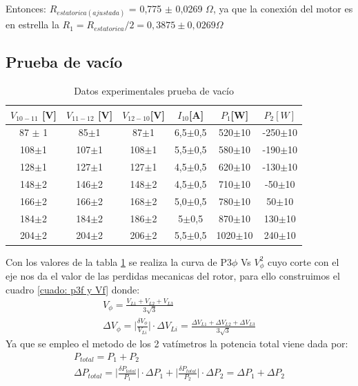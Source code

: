 \documentclass[11pt,letterpaper]{article}     %
\begin{document}
Entonces: $R_{estatorica(ajustada)}$ = 0,775 $\pm$ 0,0269 $\Omega$, ya que la conexión del motor es en estrella la $R_1=R_{estatorica}/2 = 0,3875 \pm 0,0269 \Omega$ 
\subsection{Prueba de vacío}
\begin{table}[h]
	\centering
	\caption{Datos experimentales prueba de vacío}
	\label{tabla:resultadosPruebasVacio}
	\begin{tabular}{|c|c|c|c|c|c|}
		\hline
		\textbf{$V_{10-11}$ [V]} & \textbf{$V_{11-12}$ [V]} & \textbf{$V_{12-10} $[V]} & \textbf{$I_{10} $[A]} & \textbf{$P_1$[W]} & \textbf{$P_2[W]$} \\ \hline
		87 $\pm$ 1 & 85$\pm$1 & 87$\pm$1 & 6,5$\pm$0,5 & 520$\pm$10 & -250$\pm$10 \\ \hline
		108$\pm$1 & 107$\pm$1 & 108$\pm$1 & 5,5$\pm$0,5 & 580$\pm$10 & -190$\pm$10 \\ \hline
		128$\pm$1 & 127$\pm$1 & 127$\pm$1 & 4,5$\pm$0,5 & 620$\pm$10 & -130$\pm$10 \\ \hline
		148$\pm$2 & 146$\pm$2 & 148$\pm$2 & 4,5$\pm$0,5 & 710$\pm$10 & -50$\pm$10 \\ \hline
		166$\pm$2 & 166$\pm$2 & 168$\pm$2 & 5,0$\pm$0,5 & 780$\pm$10 & 50$\pm$10 \\ \hline
		184$\pm$2 & 184$\pm$2 & 186$\pm$2 & 5$\pm$0,5 & 870$\pm$10 & 130$\pm$10 \\ \hline
		204$\pm$2 & 204$\pm$2 & 206$\pm$2 & 5,5$\pm$0,5 & 1020$\pm$10 & 240$\pm$10 \\ \hline
	\end{tabular}
\end{table}
Con los valores de la tabla \ref{tabla:resultadosPruebasVacio} se realiza la curva de P3$\phi$ Vs $V_{\phi}^2$ cuyo corte con el eje nos da el valor de las perdidas mecanicas del rotor, para ello construimos el cuadro \ref{cuado: p3f y Vf} donde:
\begin{eqnarray}
V_{\phi}=\frac{V_{L1}+V_{L2}+V_{L3}}{3\sqrt{3}}\\
\Delta V_{\phi}= \bigg|\frac{\delta V_{\phi}}{V_{Li}}\bigg| \cdot \Delta V_{Li} = \frac{\Delta V_{L1}+\Delta V_{L2}+\Delta V_{L3}}{3 \sqrt{3}}
\end{eqnarray}
Ya que se empleo el metodo de los 2 vatímetros la potencia total viene dada por:
\begin{eqnarray}
P_{total}=P_1+P_2\\
\Delta P_{total}=  \bigg|\frac{\delta P_{total}}{P_1}\bigg| \cdot \Delta P_1 + \bigg|\frac{\delta P_{total}}{P_2}\bigg| \cdot \Delta P_2 = \Delta P_1 + \Delta P_2
\end{eqnarray}
\end{document}
